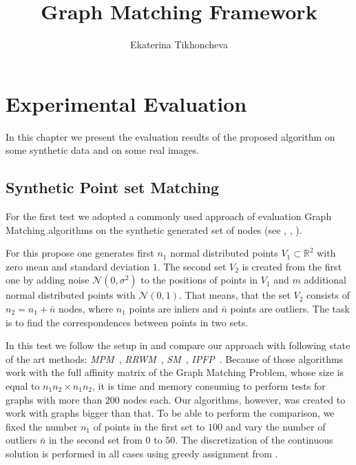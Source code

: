 \documentclass[
	fontsize=12pt,
	paper=a4,
	twoside=false,
	numbers=noenddot,
	plainheadsepline,
	toc=listof,
	toc=bibliography
]{scrartcl}
\begin{document}
\pagestyle{plain}

\title{Graph Matching Framework}
\author{Ekaterina Tikhoncheva}
\date{} 

\maketitle 



\section{Experimental Evaluation}

In this chapter we present the evaluation results of the proposed algorithm on some synthetic data and on some real images.

\subsection{Synthetic Point set Matching}

For the first test we adopted a commonly used approach of evaluation Graph Matching algorithms on the synthetic generated set of nodes (see \cite{Cho2014_Haystack}, \cite{Cho2010_RRWM}, \cite{Leordeanu2009_IPFP}). 

For this propose one generates first $n_1$ normal distributed points $V_1\subset\mathbb{R}^2$ with zero mean and standard deviation $1$. The second set $V_2$ is created from the first one by adding noise $\mathcal{N}(0,\sigma^2)$ to the positions of points in $V_1$ and $m$ additional normal distributed points with $\mathcal{N}(0,1)$.  That means, that the set $V_2$ consists of $n_2=n_1+\bar{n}$ nodes, where $n_1$ points are inliers and $\bar{n}$ points are outliers. The task is to find the correspondences between points in two sets.

In this test we follow the setup in \cite{Cho2014_Haystack} and compare our approach with following state of the art methods: \emph{MPM}~\cite{Cho2014_Haystack}, \emph{RRWM}~\cite{Cho2010_RRWM}, \emph{SM}~\cite{Leordeanu2005}, \emph{IPFP}~\cite{Leordeanu2009_IPFP}. Because of those algorithms work with the full affinity matrix of the Graph Matching Problem, whose size is equal to $n_1n_2\times n_1n_2$, it is time and memory consuming to perform tests for graphs with more than $200$ nodes each. Our algorithms, however, was created to work with graphs bigger than that. To be able to perform the comparison, we fixed the number $n_1$ of points in the first set to $100$ and vary the number of outliers $\bar{n}$ in the second set from $0$ to $50$. The discretization of the continuous solution is performed in all cases using greedy assignment from \cite{Leordeanu2005}.
\end{document}
